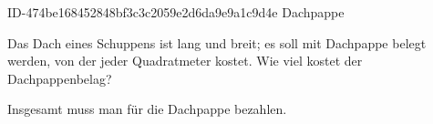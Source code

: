 \begin{exercise}
      {ID-474be168452848bf3c3c2059e2d6da9e9a1c9d4e}
      {Dachpappe}
  \ifproblem\problem\par
    Das Dach eines Schuppens ist  lang und  breit; es soll
    mit Dachpappe belegt werden, von der jeder Quadratmeter  kostet.
    Wie viel kostet der Dachpappenbelag?
  \fi
  \ifoutcome\outcome\par
    Insgesamt muss man für die Dachpappe  bezahlen.
  \fi
\end{exercise}

